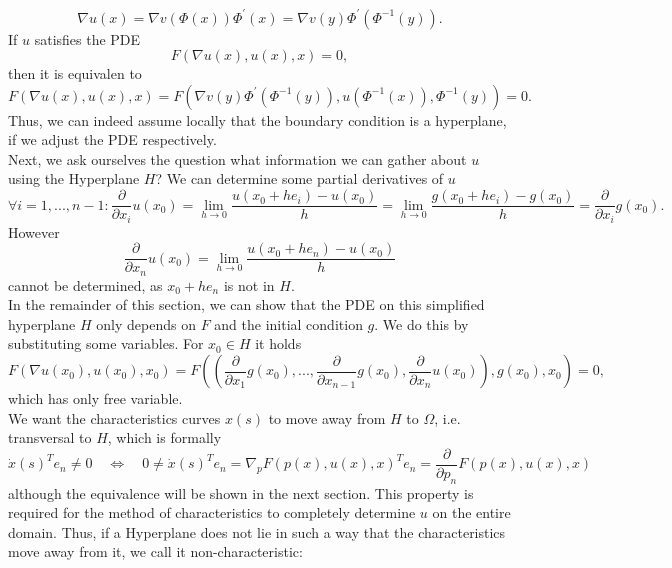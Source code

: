 \documentclass[A4,12pt,twoside]{book}
\begin{document}
\[
\nabla u (x) = \nabla v(\Phi (x)) \Phi^\prime (x) = \nabla v(y) \Phi^\prime (\Phi^{-1} (y)).
\]
If $u$ satisfies the PDE 
\[
F(\nabla u (x), u(x),x) =0,
\]
then it is equivalen to 
\[
F(\nabla u (x), u(x),x)  = F(  \nabla v(y) \Phi^\prime (\Phi^{-1} (y)), u(\Phi^{-1}(x)) , \Phi^{-1} (y)) =0.
\]
Thus, we can indeed assume locally that the boundary condition is a hyperplane, if we adjust the PDE respectively.\\
Next, we ask ourselves the question what information we can gather about $u$ using the Hyperplane $H$? We can determine some partial derivatives of $u$ 
\[
\forall i=1,...,n-1: \frac{\partial}{\partial x_i} u(x_0) = \lim_{h \to 0} \frac{u(x_0+he_i)-u(x_0)}{h} = \lim_{h \to 0}  \frac{g(x_0+he_i)-g(x_0)}{h} = \frac{\partial}{\partial x_i} g(x_0).
\]
However
\[
\frac{\partial}{\partial x_n} u(x_0) = \lim_{h \to 0} \frac{u(x_0+he_n)-u(x_0)}{h}
\]
cannot be determined, as $x_0+he_n$ is not in $H$.\\
In the remainder of this section, we can show that the PDE on this simplified hyperplane $H$ only depends on $F$ and the initial condition $g$. We do this by substituting some variables. For $x_0 \in H$ it holds 
\[
F(\nabla u(x_0),u(x_0),x_0) = F( \left( \frac{\partial}{\partial x_1} g(x_0),..., \frac{\partial}{\partial x_{n-1}} g(x_0), \frac{\partial}{\partial x_n} u(x_0) \right), g(x_0) , x_0 )=0,
\]
which has only free variable.\\
We want the characteristics curves $x(s)$ to move away from $H$ to $\Omega$, i.e. transversal to $H$, which is formally 
\[
\dot{x}(s)^T e_n \neq 0 \quad \iff \quad 0\neq \dot{x}(s)^T e_n = \nabla_p F(p(x),u(x),x)^T e_n = \frac{\partial}{\partial p_n}F(p(x),u(x),x)
\]
although the equivalence will be shown in the next section. This property is required for the method of characteristics to completely determine $u$ on the entire domain. Thus, if a Hyperplane does not lie in such a way that the characteristics move away from it, we call it non-characteristic:
\end{document}
